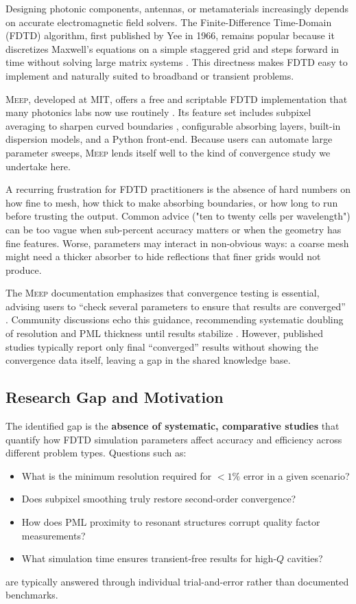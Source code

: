 \documentclass[12pt, a4paper]{article}
\newcommand{\meep}{\textsc{Meep}}
\newcommand{\fdtd}{\textsc{FDTD}}
\newcommand{\pml}{\textsc{PML}}
\begin{document}
Designing photonic components, antennas, or metamaterials increasingly depends on accurate electromagnetic field solvers. The Finite-Difference Time-Domain (\fdtd{}) algorithm, first published by Yee in 1966, remains popular because it discretizes Maxwell's equations on a simple staggered grid and steps forward in time without solving large matrix systems \citep{Taflove2005}. This directness makes \fdtd{} easy to implement and naturally suited to broadband or transient problems.

\meep{}, developed at MIT, offers a free and scriptable \fdtd{} implementation that many photonics labs now use routinely \citep{Oskooi2010}. Its feature set includes subpixel averaging to sharpen curved boundaries \citep{Farjadpour2006}, configurable absorbing layers, built-in dispersion models, and a Python front-end. Because users can automate large parameter sweeps, \meep{} lends itself well to the kind of convergence study we undertake here.

A recurring frustration for \fdtd{} practitioners is the absence of hard numbers on how fine to mesh, how thick to make absorbing boundaries, or how long to run before trusting the output. Common advice ("ten to twenty cells per wavelength") can be too vague when sub-percent accuracy matters or when the geometry has fine features. Worse, parameters may interact in non-obvious ways: a coarse mesh might need a thicker absorber to hide reflections that finer grids would not produce.

The \meep{} documentation emphasizes that convergence testing is essential, advising users to ``check several parameters to ensure that results are converged'' \citep{MeepDocs2024}. Community discussions echo this guidance, recommending systematic doubling of resolution and \pml{} thickness until results stabilize \citep{MeepDiscussion2023}. However, published studies typically report only final ``converged'' results without showing the convergence data itself, leaving a gap in the shared knowledge base.

\subsection{Research Gap and Motivation}

The identified gap is the \textbf{absence of systematic, comparative studies} that quantify how \fdtd{} simulation parameters affect accuracy and efficiency across different problem types. Questions such as:
\begin{itemize}
    \item What is the minimum resolution required for $<1\%$ error in a given scenario?
    \item Does subpixel smoothing truly restore second-order convergence?
    \item How does \pml{} proximity to resonant structures corrupt quality factor measurements?
    \item What simulation time ensures transient-free results for high-$Q$ cavities?
\end{itemize}
are typically answered through individual trial-and-error rather than documented benchmarks.
\end{document}

